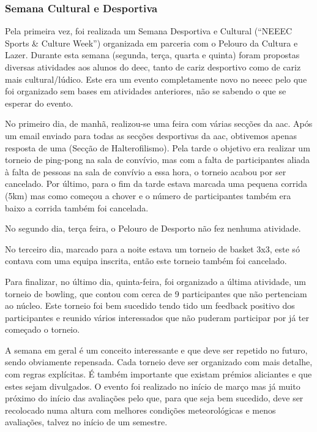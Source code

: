 
\subsubsection{Semana Cultural e Desportiva}

Pela primeira vez, foi realizada um Semana Desportiva e Cultural (“NEEEC Sports \& Culture Week”) organizada em parceria com o Pelouro da Cultura e Lazer. Durante esta semana (segunda, terça, quarta e quinta) foram propostas diversas atividades aos alunos do \acrshort{deec}, tanto de cariz desportivo como de cariz mais cultural/lúdico. Este era um evento completamente novo no \acrshort{neeec} pelo que foi organizado sem bases em atividades anteriores, não se sabendo o que se esperar do evento. 

No primeiro dia, de manhã, realizou-se uma feira com várias secções da \acrshort{aac}. Após um email enviado para todas as secções desportivas da \acrshort{aac}, obtivemos apenas resposta de uma (Secção de Halterofilismo). Pela tarde o objetivo era realizar um torneio de ping-pong na sala de convívio, mas com a falta de participantes aliada à falta de pessoas na sala de convívio a essa hora, o torneio acabou por ser cancelado. Por último, para o fim da tarde estava marcada uma pequena corrida (5km) mas como começou a chover e o número de participantes também era baixo a corrida também foi cancelada.

No segundo dia, terça feira, o Pelouro de Desporto não fez nenhuma atividade.

No terceiro dia, marcado para a noite estava um torneio de basket 3x3, este só contava com uma equipa inscrita, então este torneio também foi cancelado. 

Para finalizar, no último dia, quinta-feira, foi organizado a última atividade, um torneio de bowling, que contou com cerca de 9 participantes que não pertenciam ao núcleo. Este torneio foi bem sucedido tendo tido um feedback positivo dos participantes e reunido vários interessados que não puderam participar por já ter começado o torneio.

A semana em geral é um conceito interessante e que deve ser repetido no futuro, sendo obviamente repensada. Cada torneio deve ser organizado com mais detalhe, com regras explícitas. É também importante que existam prémios aliciantes e que estes sejam divulgados. O evento foi realizado no início de março mas já muito próximo do início das avaliações pelo que, para que seja bem sucedido, deve ser recolocado numa altura com melhores condições meteorológicas e menos avaliações, talvez no início de um semestre.